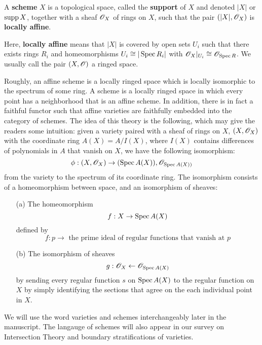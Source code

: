 	\begin{definition}[Scheme]
	A \textbf{scheme} $X$ is a topological space, 
	called the \textbf{support} of $X$ 
	and denoted $|X|$ or $\operatorname{supp} X$,
	together with a sheaf $\mathscr O_X$ of rings on $X$,
	such that the pair $(|X|, \mathscr O_X)$ is \textbf{locally affine}.
	\end{definition}
	Here, \textbf{locally affine} means that $|X|$ is covered
	by open sets $U_i$ such that there exists rings $R_i$
	and homeomorphisms $U_i \cong |\operatorname{Spec} R_i|$ 
	with $\mathscr O_X|_{U_i} \cong \mathscr O_{\operatorname{Spec} R}$.
	We usually call the pair $(X, \mathscr O)$ a ringed space. 
	
	Roughly, an affine scheme is a locally ringed space 
	which is locally isomorphic to the spectrum of some ring.
        A scheme is a locally ringed space 
        in which every point has a neighborhood that is an affine scheme.
        In addition,
        there is in fact a faithful functor such that 
        affine varieties are faithfully embedded into the category of schemes.
        The idea of this theory is the following, 
        which may give the readers some intuition:
        given a variety paired with a sheaf of rings on $X$, 
        $(X, \mathscr O_X)$ with the coordinate ring 
        $A(X) = A/I(X)$,
        where $I(X)$ contains differences of polynomials in $A$ 
        that vanish on $X$,
        we have the following isomorphism:
        \[
        \phi: (X, \mathscr O_X) \rightarrow (\operatorname{Spec} A(X)), \mathscr O_{\operatorname{Spec} A(X))}
        \]
        from the variety to the spectrum of its coordinate ring.
        The isomorphism consists of a homeomorphism between space,
        and an isomorphism of sheaves:
        \begin{enumerate}
        \item[(a)]
        	 	The homeomorphism 
         	\[
        	 	f: X \rightarrow \operatorname{Spec} A(X) 
         	\]
         	defined by 
         	\[
         	f: p \rightarrow \text{ the prime ideal of regular functions that vanish at $p$}
         	\]
	
    	\item[(b)]
		The isomorphism of sheaves 
		\[
		g: \mathscr O_X \leftarrow \mathscr O_{\operatorname{Spec} A(X)}
		\]
		by sending every regular function $s$ on $\operatorname{Spec} A(X)$
		to the regular function on $X$ 
		by simply identifying the sections 
		that agree on the each individual point in $X$. 
        \end{enumerate}
         
        We will use the word varieties and schemes interchangeably later in the manuscript. The langauge of schemes will also appear in our survey on Intersection Theory and boundary stratifications of varieties. 